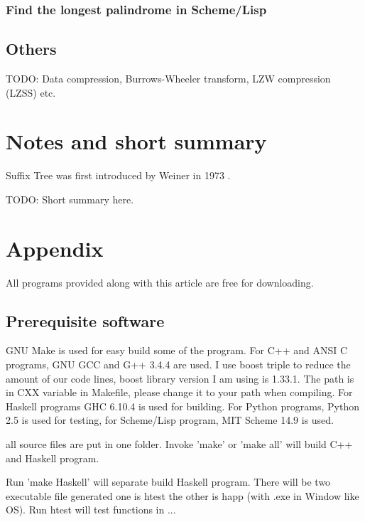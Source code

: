 \documentclass{article}
\begin{document}
\subsubsection*{Find the longest palindrome in Scheme/Lisp}

\subsection{Others}
TODO: Data compression, Burrows-Wheeler transform, LZW compression (LZSS)
etc.

\section{Notes and short summary}

Suffix Tree was first introduced by Weiner in 1973 \cite{weiner}.

TODO: Short summary here.

\section{Appendix} \label{appendix}
All programs provided along with this article are free for
downloading.

\subsection{Prerequisite software}
GNU Make is used for easy build some of the program. For C++ and ANSI C programs,
GNU GCC and G++ 3.4.4 are used. I use boost triple to reduce the
amount of our code lines, boost library version I am using is
1.33.1. The path is in CXX variable in Makefile, please change it to
your path when compiling.
For Haskell programs GHC 6.10.4 is used
for building. For Python programs, Python 2.5 is used for testing, for
Scheme/Lisp program, MIT Scheme 14.9 is used.

all source files are put in one folder. Invoke 'make' or 'make all'
will build C++ and Haskell program. 

Run 'make Haskell' will separate build Haskell program. There will be
two executable file generated one is htest the other is happ (with .exe
in Window like OS). Run htest will test functions in ...
\end{document}
